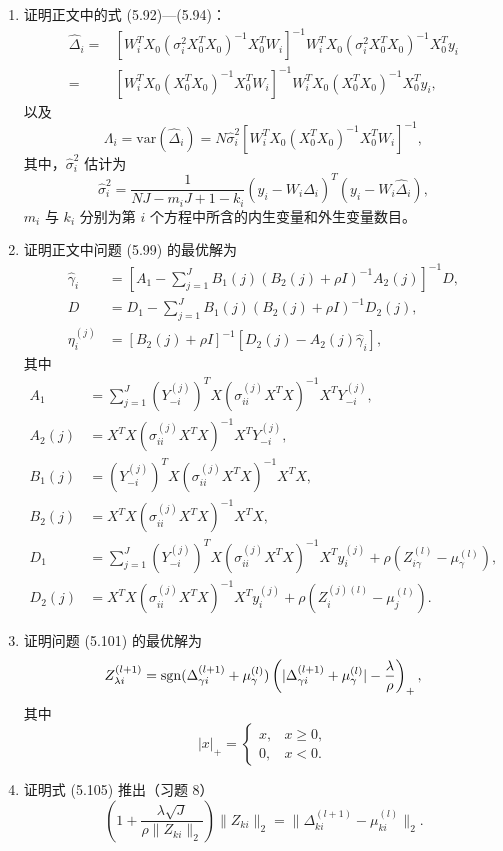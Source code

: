 \begin{enumerate}[label=\textbf{习题 \arabic*.},leftmargin=4.7em]
\item 证明正文中的式 (5.92)—(5.94)：
\begin{equation}
\begin{aligned}
\widehat\Delta_i
={}&\left[W_i^TX_0(\sigma_i^2X_0^TX_0)^{-1}X_0^TW_i\right]^{-1}
W_i^TX_0(\sigma_i^2X_0^TX_0)^{-1}X_0^Ty_i\\
={}&\left[W_i^TX_0(X_0^TX_0)^{-1}X_0^TW_i\right]^{-1}
W_i^TX_0(X_0^TX_0)^{-1}X_0^Ty_i,
\end{aligned}
\tag{5.92}
\end{equation}
以及
\begin{equation}
\Lambda_i=\mathrm{var}(\widehat\Delta_i)
=N\widehat\sigma_i^2\left[W_i^TX_0(X_0^TX_0)^{-1}X_0^TW_i\right]^{-1},
\tag{5.93}
\end{equation}
其中，$\widehat\sigma_i^2$ 估计为
\begin{equation}
\widehat\sigma_i^2=\frac1{NJ-m_iJ+1-k_i}
(y_i-W_i\widehat\Delta_i)^T(y_i-W_i\widehat\Delta_i),
\tag{5.94}
\end{equation}
$m_i$ 与 $k_i$ 分别为第 $i$ 个方程中所含的内生变量和外生变量数目。

\item 证明正文中问题 (5.99) 的最优解为
\[
\begin{aligned}
\widehat\gamma_i&=\left[A_1-\sum_{j=1}^JB_1(j)(B_2(j)+\rho I)^{-1}A_2(j)\right]^{-1}D,\\
D&=D_1-\sum_{j=1}^JB_1(j)(B_2(j)+\rho I)^{-1}D_2(j),\\
\eta_i^{(j)}&=[B_2(j)+\rho I]^{-1}[D_2(j)-A_2(j)\widehat\gamma_i],
\end{aligned}
\]
其中
\[
\begin{aligned}
A_1&=\sum_{j=1}^J(Y_{-i}^{(j)})^TX(\sigma_{ii}^{(j)}X^TX)^{-1}X^TY_{-i}^{(j)},\\
A_2(j)&=X^TX(\sigma_{ii}^{(j)}X^TX)^{-1}X^TY_{-i}^{(j)},\\
B_1(j)&=(Y_{-i}^{(j)})^TX(\sigma_{ii}^{(j)}X^TX)^{-1}X^TX,\\
B_2(j)&=X^TX(\sigma_{ii}^{(j)}X^TX)^{-1}X^TX,\\
D_1&=\sum_{j=1}^J(Y_{-i}^{(j)})^TX(\sigma_{ii}^{(j)}X^TX)^{-1}X^Ty_i^{(j)}
+\rho(Z_{i\gamma}^{(l)}-\mu_\gamma^{(l)}),\\
D_2(j)&=X^TX(\sigma_{ii}^{(j)}X^TX)^{-1}X^Ty_i^{(j)}
+\rho(Z_i^{(j)(l)}-\mu_j^{(l)}).
\end{aligned}
\]

\item 证明问题 (5.101) 的最优解为
\[
Z_{\lambda i}^{(l+1)}=\operatorname{sgn}(\Delta_{\gamma i}^{(l+1)}+\mu_\gamma^{(l)})
\left(|\Delta_{\gamma i}^{(l+1)}+\mu_\gamma^{(l)}|-\frac\lambda\rho\right)_+,
\]
其中
\[
|x|_+=\begin{cases}x,&x\geq0,\\0,&x<0.\end{cases}
\]

\item 证明式 (5.105) 推出（习题 8）
\[
\left(1+\frac{\lambda\sqrt J}{\rho\lVert Z_{ki}\rVert_2}\right)\lVert Z_{ki}\rVert_2
=\lVert\Delta_{ki}^{(l+1)}-\mu_{ki}^{(l)}\rVert_2.
\]
\end{enumerate}
